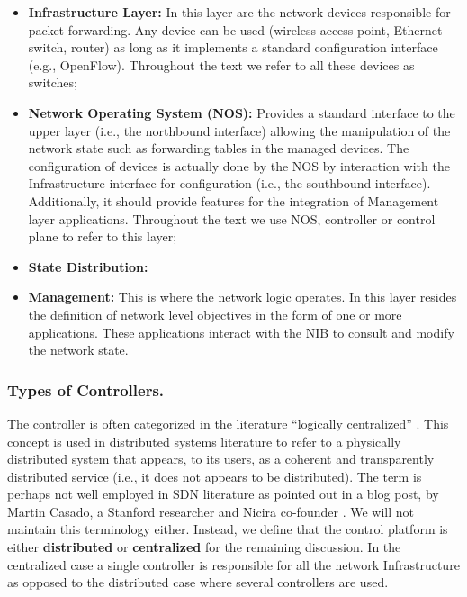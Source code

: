\begin{itemize}
\item[] \textbf{Infrastructure Layer:} In this layer are the network
  devices responsible for packet forwarding. Any device 
  can be used (wireless access point, Ethernet switch, router) as long as it implements 
  a standard configuration interface (e.g., OpenFlow). Throughout the text we refer to all these devices as switches;
\item[] \textbf{Network Operating System (NOS):} Provides a standard
  interface to the upper layer (i.e., the northbound interface) allowing the manipulation of the network
  state such as forwarding tables in the managed devices. The
  configuration of devices is actually done by the NOS by interaction
  with the Infrastructure interface for configuration (i.e., the southbound interface). Additionally, it should provide features
  for the integration of Management layer applications.  Throughout
  the text we use NOS, controller or control plane to refer to this
  layer;
\item[] \textbf{State Distribution: } 
\item[] \textbf{Management:} This is where the network logic operates. In this layer
  resides the definition of network level objectives in the form of
  one or more applications. These applications interact with the NIB
  to consult and modify the network state. 
\end{itemize}


\subsubsection{Types of Controllers.} The controller is often
categorized in the literature
``logically centralized'' \cite{Gude:2008jd,Greenberg:2005boa}. This concept is used in distributed systems literature
to refer to a physically distributed system that appears, to
its users,  as a
coherent and  transparently distributed service (i.e., it does not
appears to be distributed). The term is perhaps
not well employed in SDN literature as pointed out in
a blog post, by Martin Casado, a Stanford researcher and Nicira
co-founder \cite{:zr}. We will not maintain
this terminology either. Instead, we define that the control platform is 
either  \textbf{distributed} or 
\textbf{centralized} for the remaining discussion. In the centralized
case a single controller is responsible for all the network
Infrastructure as opposed to the distributed case where several
controllers are used.

